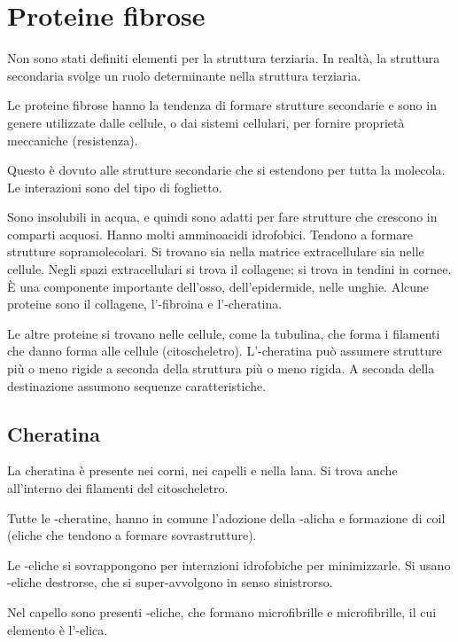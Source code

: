 \chapter{Proteine fibrose}


Non sono stati definiti elementi per la struttura terziaria. In realtà,
la struttura secondaria svolge un ruolo determinante nella struttura
terziaria.

Le proteine fibrose hanno la tendenza di formare strutture secondarie e
sono in genere utilizzate dalle cellule, o dai sistemi cellulari, per fornire
proprietà meccaniche (resistenza).

Questo è dovuto alle strutture secondarie che si estendono per tutta la
molecola. Le interazioni sono del tipo di foglietto.

Sono insolubili in acqua, e quindi sono adatti per fare strutture che
crescono in comparti acquosi. Hanno molti amminoacidi idrofobici.
Tendono a formare strutture sopramolecolari. Si trovano sia nella
matrice extracellulare sia nelle cellule. Negli spazi extracellulari si
trova il collagene; si trova in tendini in cornee. È una componente
importante dell'osso, dell'epidermide, nelle unghie.
Alcune proteine sono il collagene, l'\alpha-fibroina e l'\alpha-cheratina.

Le altre proteine si trovano nelle cellule, come la tubulina, che forma i filamenti che
danno forma alle cellule (citoscheletro). L'\alpha-cheratina può assumere
strutture più o meno rigide a seconda della struttura più o meno rigida.
A seconda della destinazione assumono sequenze caratteristiche.

\section{Cheratina}

La cheratina è presente nei corni, nei capelli e nella lana. Si trova anche
all'interno dei filamenti del citoscheletro.

Tutte le \alpha-cheratine, hanno in comune l'adozione della \alpha-alicha e
formazione di coil (eliche che tendono a formare sovrastrutture).

Le \alpha-eliche si sovrappongono per interazioni idrofobiche per
minimizzarle. Si usano \alpha-eliche destrorse, che si super-avvolgono in
senso sinistrorso.

Nel capello sono presenti \alpha-eliche, che formano microfibrille e
microfibrille, il cui elemento è l'\alpha-elica.

